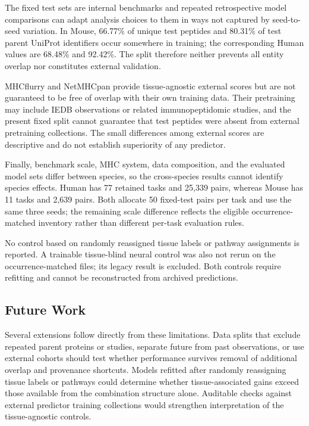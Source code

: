 The fixed test sets are internal benchmarks and repeated retrospective model comparisons can adapt analysis choices to them in ways not captured by seed-to-seed variation. In Mouse, 66.77\% of unique test peptides and 80.31\% of test parent UniProt identifiers occur somewhere in training; the corresponding Human values are 68.48\% and 92.42\%. The split therefore neither prevents all entity overlap nor constitutes external validation.

MHCflurry and NetMHCpan provide tissue-agnostic external scores but are not guaranteed to be free of overlap with their own training data. Their pretraining may include IEDB observations or related immunopeptidomic studies, and the present fixed split cannot guarantee that test peptides were absent from external pretraining collections. The small differences among external scores are descriptive and do not establish superiority of any predictor.

Finally, benchmark scale, MHC system, data composition, and the evaluated model sets differ between species, so the cross-species results cannot identify species effects. Human has 77 retained tasks and 25,339 pairs, whereas Mouse has 11 tasks and 2,639 pairs. Both allocate 50 fixed-test pairs per task and use the same three seeds; the remaining scale difference reflects the eligible occurrence-matched inventory rather than different per-task evaluation rules.

No control based on randomly reassigned tissue labels or pathway assignments is reported. A trainable tissue-blind neural control was also not rerun on the occurrence-matched files; its legacy result is excluded. Both controls require refitting and cannot be reconstructed from archived predictions.

\subsection{Future Work}

Several extensions follow directly from these limitations. Data splits that exclude repeated parent proteins or studies, separate future from past observations, or use external cohorts should test whether performance survives removal of additional overlap and provenance shortcuts. Models refitted after randomly reassigning tissue labels or pathways could determine whether tissue-associated gains exceed those available from the combination structure alone. Auditable checks against external predictor training collections would strengthen interpretation of the tissue-agnostic controls.

